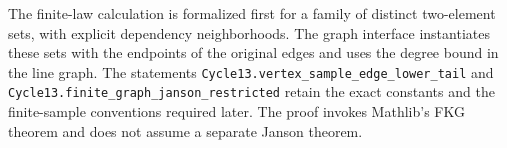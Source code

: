 The finite-law calculation is formalized first for a family of distinct
two-element sets, with explicit dependency neighborhoods. The graph
interface instantiates these sets with the endpoints of the original
edges and uses the degree bound in the line graph. The statements
{\small\nolinkurl{Cycle13.vertex_sample_edge_lower_tail}} and
{\small\nolinkurl{Cycle13.finite_graph_janson_restricted}} retain the exact constants
and the finite-sample conventions required later. The proof invokes
Mathlib's FKG theorem and does not assume a separate Janson theorem.
